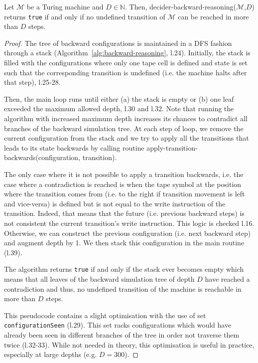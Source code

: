 \begin{theorem}\label{th:backward-reasoning}
  Let $\mathcal{M}$ be a Turing machine and $D\in\mathbb{N}$.
  Then, {\sc decider-backward-reasoning}($\mathcal{M}$,$D$) returns \texttt{true} if and only if no undefined transition of $\mathcal{M}$ can be reached in more than $D$ steps.
\end{theorem}
\begin{proof}
  The tree of backward configurations is maintained in a DFS fashion through a stack (Algorithm~\ref{alg:backward-reasoning}, l.24). Initially, the stack is filled with the configurations where only one tape cell is defined and state is set such that the corresponding transition is undefined (i.e. the machine halts after that step), l.25-28.

  Then, the main loop runs until either (a) the stack is empty or (b) one leaf exceeded the maximum allowed depth, l.30 and l.32. Note that running the algorithm with increased maximum depth increases its chances to contradict all branches of the backward simulation tree. At each step of loop, we remove the current configuration from the stack and we try to apply all the transitions that leads to its state backwards by calling routine {\sc apply-transition-backwards}(configuration, transition).

  The only case where it is not possible to apply a transition backwards, i.e. the case where a contradiction is reached is when the tape symbol at the position where the transition comes from (i.e. to the right if transition movement is left and vice-versa) is defined but is not equal to the write instruction of the transition. Indeed, that means that the future (i.e. previous backward steps) is not consistent the current transition's write instruction. This logic is checked l.16. Otherwise, we can construct the previous configuration (i.e. next backward step) and augment depth by 1. We then stack this configuration in the main routine (l.39).

  The algorithm returns \texttt{true} if and only if the stack ever becomes empty which means that all leaves of the backward simulation tree of depth $D$ have reached a contradiction and thus, no undefined transition of the machine is reachable in more than $D$ steps.

  This pseudocode contains a slight optimisation with the use of set \texttt{configurationSeen} (l.29). This set racks configurations which would have already been seen in different branches of the tree in order not traverse them twice (l.32-33). While not needed in theory, this optimisation is useful in practice, especially at large depths (e.g. $D=300$).
\end{proof}

